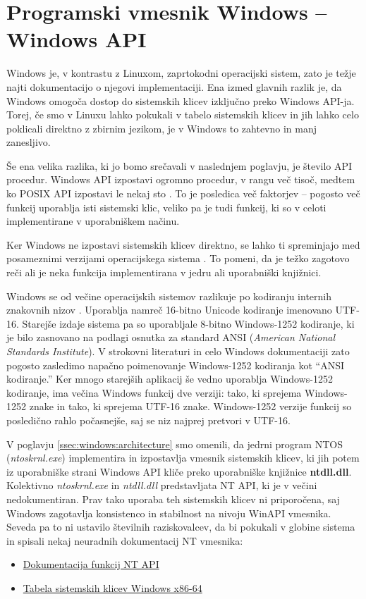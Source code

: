 \documentclass[a4paper,12pt,openright]{book}
\begin{document}
\section{Programski vmesnik Windows -- Windows API}

Windows je, v kontrastu z Linuxom, zaprtokodni operacijski sistem, zato je težje najti dokumentacijo o njegovi implementaciji.
Ena izmed glavnih razlik je, da Windows omogoča dostop do sistemskih klicev izključno preko Windows API-ja.
Torej, če smo v Linuxu lahko pokukali v tabelo sistemskih klicev in jih lahko celo poklicali direktno z zbirnim jezikom, je v Windows to zahtevno in manj zanesljivo.

Še ena velika razlika, ki jo bomo srečavali v naslednjem poglavju, je število API procedur.
Windows API izpostavi ogromno procedur, v rangu več tisoč, medtem ko POSIX API izpostavi le nekaj sto \cite{Tanenbaum_Bos_2023}.
To je posledica več faktorjev -- pogosto več funkcij uporablja isti sistemski klic, veliko pa je tudi funkcij, ki so v celoti implementirane v uporabniškem načinu.

Ker Windows ne izpostavi sistemskih klicev direktno, se lahko ti spreminjajo med posameznimi verzijami operacijskega sistema \cite{Tanenbaum_Bos_2023}.
To pomeni, da je težko zagotovo reči ali je neka funkcija implementirana v jedru ali uporabniški knjižnici.

Windows se od večine operacijskih sistemov razlikuje po kodiranju internih znakovnih nizov \cite{Yosifovich_Russinovich_Solomon_Ionescu_2017}.
Uporablja namreč 16-bitno Unicode kodiranje imenovano UTF-16.
Starejše izdaje sistema pa so uporabljale 8-bitno Windows-1252 kodiranje, ki je bilo zasnovano na podlagi osnutka za standard ANSI (\textit{American National Standards Institute}).
V strokovni literaturi in celo Windows dokumentaciji zato pogosto zasledimo napačno poimenovanje Windows-1252 kodiranja kot ``ANSI kodiranje.''
Ker mnogo starejših aplikacij še vedno uporablja Windows-1252 kodiranje, ima večina Windows funkcij dve verziji: tako, ki sprejema Windows-1252 znake in tako, ki sprejema UTF-16 znake.
Windows-1252 verzije funkcij so posledično rahlo počasnejše, saj se niz najprej pretvori v UTF-16.

V poglavju \ref{ssec:windows:architecture} smo omenili, da jedrni program NTOS (\textit{ntoskrnl.exe}) implementira in izpostavlja vmesnik sistemskih klicev, ki jih potem iz uporabniške strani Windows API kliče preko uporabniške knjižnice \textbf{ntdll.dll}.
Kolektivno \textit{ntoskrnl.exe} in \textit{ntdll.dll} predstavljata NT API, ki je v večini nedokumentiran.
Prav tako uporaba teh sistemskih klicev ni priporočena, saj Windows zagotavlja konsistenco in stabilnost na nivoju WinAPI vmesnika.
Seveda pa to ni ustavilo številnih raziskovalcev, da bi pokukali v globine sistema in spisali nekaj neuradnih dokumentacij NT vmesnika:
\begin{itemize}
	\item \href{http://undocumented.ntinternals.net/}{Dokumentacija funkcij NT API}
	\item \href{https://j00ru.vexillium.org/syscalls/nt/64/}{Tabela sistemskih klicev Windows x86-64}
\end{itemize}
\end{document}
